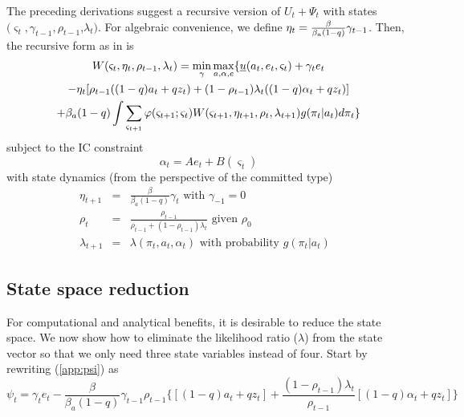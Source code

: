 \documentclass[12pt,letter,leqno]{article}
\theoremstyle{asn}
\theoremstyle{lem}
\theoremstyle{slem}
\theoremstyle{prop}
\theoremstyle{appprop}
\theoremstyle{rem}
\theoremstyle{defn}
\begin{document}
The preceding derivations suggest a recursive version of $U_t + \Psi_t$ with states $(\varsigma _{t},\gamma _{t-1},\rho _{t-1}$,$\lambda _{t})$. For algebraic convenience, we define $\eta _{t}=\frac{\beta }{%
\beta_{a}(1-q)}\gamma _{t-1}$. Then, the recursive form as in  is
\begin{multline}
W(\varsigma _{t},\eta _{t},\rho _{t-1},\lambda _{t}) =
\min_{\gamma
}\max_{a,\alpha ,e}\{ \uline{u}(a_{t},e_{t},\varsigma _{t})+\gamma_{t}e_{t}  \\
-\eta_{t} [\rho
_{t-1}((1-q)a_{t}+qz_{t})+(1-\rho _{t-1})\lambda _{t}((1-q)\alpha
_{t}+qz_{t})] \\
+\beta_{a}(1-q)\int \sum_{\varsigma _{t+1}}\varphi (\varsigma
_{t+1};\varsigma _{t})W(\varsigma _{t+1},\eta _{t+1},\rho _{t},\lambda
_{t+1})g(\pi_t|a_{t})d\pi_t \}  \label{W recursion}
\end{multline}
subject to the IC constraint 
\begin{equation*}
\alpha _{t}=Ae_{t}+B(\varsigma _{t})
\end{equation*}%
with state dynamics (from the perspective of the committed type) 
\begin{eqnarray*}
\eta _{t+1} &=&\frac{\beta }{\beta_{a}(1-q)}\gamma _{t} \text{ with } \gamma_{-1}=0 \\
\rho _{t} &=&\frac{\rho _{t-1}}{\rho _{t-1}+(1-\rho _{t-1})\lambda _{t}} \text{ given } \rho_{0}\\
\lambda _{t+1} &=&\lambda (\pi_t ,a_t,\alpha_t )\text{ with probability } g(\pi_t |a_t)%
\text{ }
\end{eqnarray*}


\subsection{State space reduction} \label{appsec:recursive9}
For computational and analytical benefits, it is desirable to reduce the state space. We now show how to eliminate the likelihood ratio ($\lambda$) from the state vector so that we only need three state variables instead of four.
Start by rewriting (\ref{app:psi}) as 
\begin{equation}
\psi _{t}=\gamma_t e_t -\frac{\beta }{\beta_{a}(1-q)}\gamma _{t-1}\rho
_{t-1}\{[(1-q)a_{t}+qz_{t}]+\frac{(1-\rho _{t-1})\lambda _{t}}{\rho _{t-1}}%
[(1-q)\alpha _{t}+qz_{t}]\}
\end{equation}
\end{document}
